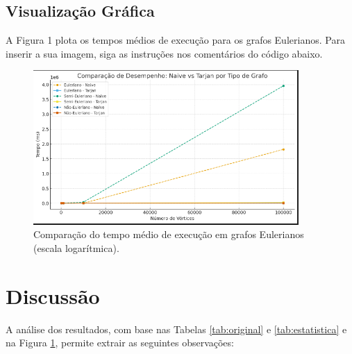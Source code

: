 \documentclass[12pt]{article}
\begin{document}
\subsection{Visualização Gráfica}
A Figura 1 plota os tempos médios de execução para os grafos Eulerianos. Para inserir a sua imagem, siga as instruções nos comentários do código abaixo.

\begin{figure}[h!]
\centering

 \includegraphics[width=0.9\textwidth]{grafico.png}

\caption{Comparação do tempo médio de execução em grafos Eulerianos (escala logarítmica).}
\label{fig:desempenho}
\end{figure}

\section{Discussão}
A análise dos resultados, com base nas Tabelas \ref{tab:original} e \ref{tab:estatistica} e na Figura \ref{fig:desempenho}, permite extrair as seguintes observações:
\end{document}
